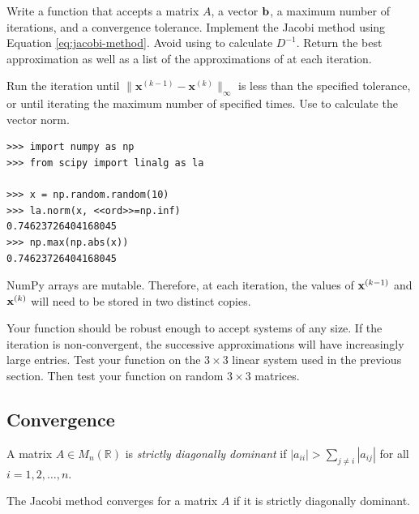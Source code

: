 \begin{problem} %
Write a function that accepts a matrix $A$, a vector $\mathbf{b}$, a maximum number of iterations, and a convergence tolerance.
Implement the Jacobi method using Equation \ref{eq:jacobi-method}.
Avoid using  to calculate $D^{-1}$.
Return the best approximation  as well as a list of the approximations of  at each iteration.

Run the iteration until $\|\mathbf{x}^{(k-1)} - \mathbf{x}^{(k)}\|_{\infty}$ is less than the specified tolerance, or until iterating the maximum number of specified times.
Use  to calculate the vector norm.

\begin{lstlisting}
>>> import numpy as np
>>> from scipy import linalg as la

>>> x = np.random.random(10)
>>> la.norm(x, <<ord>>=np.inf)
0.74623726404168045
>>> np.max(np.abs(x))
0.74623726404168045
\end{lstlisting}

\begin{warn}
NumPy arrays are mutable.
Therefore, at each iteration, the values of $\mathbf{x}^{(k-1)}$ and $\mathbf{x}^{(k)}$ will need to be stored in two distinct copies.
\end{warn}

Your function should be robust enough to accept systems of any size.
If the iteration is non-convergent, the successive approximations will have increasingly large entries.
Test your function on the $3 \times 3$ linear system used in the previous section.
Then test your function on random $3 \times 3$ matrices.
\label{prob:jacobi}
\end{problem}

\subsection*{Convergence} %


\begin{definition}
    A matrix $A \in M_n(\mathbb{R})$ is \emph{strictly diagonally dominant} if
    $|a_{ii}| > \sum_{j \neq i} |a_{ij}|$ for all $i = 1,2,\hdots,n$.
\end{definition}

\begin{theorem}
The Jacobi method converges for a matrix $A$ if it is strictly diagonally
dominant.
\end{theorem}

